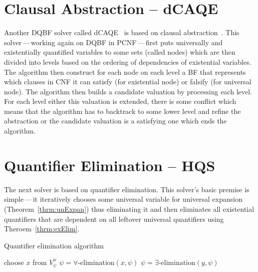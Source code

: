 \documentclass[
  digital, %
  twoside, %
  table,   %
  nolof,     %
  nolot,     %
]{fithesis3}
\theoremstyle{definition}
\theoremstyle{remark}
\begin{document}
\section{Clausal Abstraction -- dCAQE}
Another DQBF solver called dCAQE~\cite{dCAQE} is based on clausal abstraction~\cite{ClausalAbstr}. This solver\,---\,working again on DQBF in PCNF\,---\,first puts universally and existentially quantified variables to some sets (called nodes) which are then divided into levels based on the ordering of dependencies of existential variables. The algorithm then construct for each node on each level a BF that represents which clauses in CNF it can satisfy (for existential node) or falsify (for universal node). The algorithm then builds a candidate valuation by processing each level. For each level either this valuation is extended, there is some conflict which means that the algorithm has to backtrack to some lower level and refine the abstraction or the candidate valuation is a satisfying one which ends the algorithm.



\section{Quantifier Elimination -- HQS}
The next solver is based on quantifier elimination. This solver's basic premise is simple\,---\,it iteratively chooses some universal variable for universal expansion (Theorem~\ref{thrm:unExpan}) thus eliminating it and then eliminates all existential quantifiers that are dependent on all leftover universal quantifiers using Theroem~\ref{thrm:exElim}.

\begin{algorithm}
\caption{Quantifier elimination algorithm}
\label{alg:QE}
\begin{algorithmic}[1]
    \State choose $x$ from $V_{\psi}^{\forall}$
    \State $\psi = \forall\text{-elimination}(x,\psi)$%
        \State $\psi = \exists\text{-elimination}(y,\psi)$%
    \EndFor
\EndWhile
\EndFunction
\end{algorithmic}
\end{algorithm}
\end{document}
